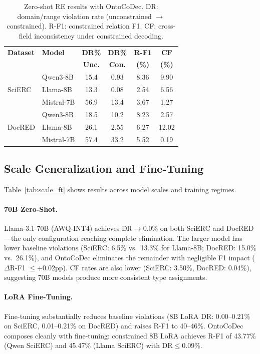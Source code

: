 \documentclass[11pt]{article}
\begin{document}
\begin{table}[t]
\centering
\small
\begin{tabular}{@{}llcccc@{}}
\toprule
\textbf{Dataset} & \textbf{Model} & \textbf{DR\%} & \textbf{DR\%} & \textbf{R-F1} & \textbf{CF} \\
& & \textbf{Unc.} & \textbf{Con.} & \textbf{(\%)} & \textbf{(\%)} \\
\midrule
\multirow{3}{*}{SciERC}
& Qwen3-8B & 15.4 & 0.93 & 8.36 & 9.90 \\
& Llama-8B & 13.3 & 0.08 & 2.54 & 6.56 \\
& Mistral-7B & 56.9 & 13.4 & 3.67 & 1.27 \\
\midrule
\multirow{3}{*}{DocRED}
& Qwen3-8B & 18.5 & 10.2 & 8.23 & 2.57 \\
& Llama-8B & 26.1 & 2.55 & 6.27 & 12.02 \\
& Mistral-7B & 57.4 & 33.2 & 5.52 & 0.19 \\
\bottomrule
\end{tabular}
\caption{Zero-shot RE results with OntoCoDec. DR: domain/range violation rate (unconstrained $\to$ constrained). R-F1: constrained relation F1. CF: cross-field inconsistency under constrained decoding.}
\label{tab:re_zs}
\end{table}

\subsection{Scale Generalization and Fine-Tuning}

Table~\ref{tab:scale_ft} shows results across model scales and training regimes.

\paragraph{70B Zero-Shot.}
Llama-3.1-70B (AWQ-INT4) achieves DR$\to$0.0\% on both SciERC and DocRED---the only configuration reaching complete elimination.
The larger model has lower baseline violations (SciERC: 6.5\% vs.\ 13.3\% for Llama-8B; DocRED: 15.0\% vs.\ 26.1\%), and OntoCoDec eliminates the remainder with negligible F1 impact ($\Delta$R-F1 $\leq$+0.02pp).
CF rates are also lower (SciERC: 3.50\%, DocRED: 0.04\%), suggesting 70B models produce more consistent type assignments.

\paragraph{LoRA Fine-Tuning.}
Fine-tuning substantially reduces baseline violations (8B LoRA DR: 0.00--0.21\% on SciERC, 0.01--0.21\% on DocRED) and raises R-F1 to 40--46\%.
OntoCoDec composes cleanly with fine-tuning: constrained 8B LoRA achieves R-F1 of 43.77\% (Qwen SciERC) and 45.47\% (Llama SciERC) with DR$\leq$0.09\%.
\end{document}
